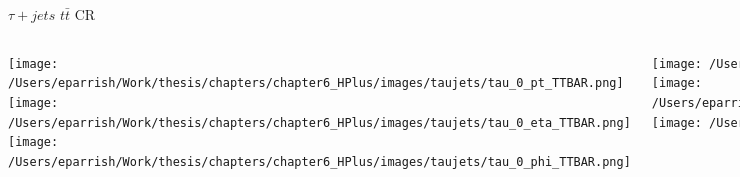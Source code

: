 \documentclass[aspectratio=169,xcolor=table]{beamer}
\begin{document}
    \begin{frame}[t]{$\tau+jets$ $t\bar{t}$ CR}
      \begin{columns}[t]
          \texttt{[image: /Users/eparrish/Work/thesis/chapters/chapter6\_HPlus/images/taujets/tau\_0\_pt\_TTBAR.png]}
          \texttt{[image: /Users/eparrish/Work/thesis/chapters/chapter6\_HPlus/images/taujets/tau\_0\_eta\_TTBAR.png]}
          \texttt{[image: /Users/eparrish/Work/thesis/chapters/chapter6\_HPlus/images/taujets/tau\_0\_phi\_TTBAR.png]}

          \texttt{[image: /Users/eparrish/Work/thesis/chapters/chapter6\_HPlus/images/taujets/tau\_0\_upsilon\_TTBAR.png]}
          \texttt{[image: /Users/eparrish/Work/thesis/chapters/chapter6\_HPlus/images/taujets/tau\_0\_charged\_tracks\_0\_pt\_TTBAR.png]}
          \texttt{[image: /Users/eparrish/Work/thesis/chapters/chapter6\_HPlus/images/taujets/n\_jets\_TTBAR.png]}

          \texttt{[image: /Users/eparrish/Work/thesis/chapters/chapter6\_HPlus/images/taujets/met\_et\_TTBAR.png]}
          \texttt{[image: /Users/eparrish/Work/thesis/chapters/chapter6\_HPlus/images/taujets/met\_phi\_TTBAR.png]}
          \texttt{[image: /Users/eparrish/Work/thesis/chapters/chapter6\_HPlus/images/taujets/n\_bjets\_DL1r\_FixedCutBEff\_70\_TTBAR.png]}

          \texttt{[image: /Users/eparrish/Work/thesis/chapters/chapter6\_HPlus/images/taujets/bjet\_0\_pt\_TTBAR.png]}
          \texttt{[image: /Users/eparrish/Work/thesis/chapters/chapter6\_HPlus/images/taujets/bjet\_0\_eta\_TTBAR.png]}
          \texttt{[image: /Users/eparrish/Work/thesis/chapters/chapter6\_HPlus/images/taujets/bjet\_0\_phi\_TTBAR.png]}

      \end{columns}
    \end{frame}
\end{document}
